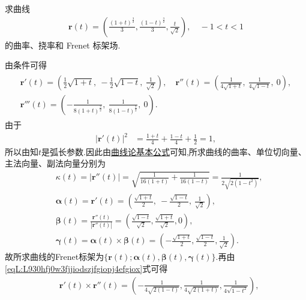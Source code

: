 \documentclass[../../main.tex]{subfiles}%
\begin{document}
\begin{example}
求曲线
\begin{align*}
\bm{r}(t) = \left( \frac{(1+t)^{\frac{3}{2}}}{3}, \frac{(1-t)^{\frac{3}{2}}}{3}, \frac{t}{\sqrt{2}} \right),\quad -1 < t < 1
\end{align*}
的曲率、挠率和 Frenet 标架场.
\end{example}
\begin{solution}
由条件可得
\begin{gather}\label{eqL:L930hfj0w3fjjiodszjfgiopj4efgiox}
\begin{gathered}
\bm{r}'(t) = \left( \frac{1}{2}\sqrt{1+t},\ -\frac{1}{2}\sqrt{1-t},\ \frac{1}{\sqrt{2}} \right), \quad
\bm{r}''(t) = \left( \frac{1}{4\sqrt{1+t}},\ \frac{1}{4\sqrt{1-t}},\ 0 \right), \\
\bm{r}'''(t) = \left( -\frac{1}{8(1+t)^{\frac{3}{2}}},\ \frac{1}{8(1-t)^{\frac{3}{2}}},\ 0 \right).
\end{gathered}
\end{gather}
由于
\begin{align*}
|\bm{r}'(t)|^2 &= \frac{1+t}{4}+\frac{1-t}{4}+\frac{1}{2}=1,
\end{align*}
所以由知$t$是弧长参数.因此由\hyperref[theorem:曲线论基本公式]{曲线论基本公式}可知,所求曲线的曲率、单位切向量、主法向量、副法向量分别为
\begin{align*}
&\kappa (t)=|\boldsymbol{r}'' (t)|=\sqrt{\frac{1}{16(1+t)}+\frac{1}{16(1-t)}}=\frac{1}{2\sqrt{2(1-t^2)}},
\\
&\bm{\alpha}(t) = \bm{r}'(t) = \left( \frac{\sqrt{1+t}}{2},\ -\frac{\sqrt{1-t}}{2},\ \frac{1}{\sqrt{2}} \right),
\\
&\boldsymbol{\beta }(t)=\frac{\boldsymbol{r}'' (t)}{|\boldsymbol{r}'' (t)|}=\left( \frac{\sqrt{1-t}}{\sqrt{2}}, \frac{\sqrt{1+t}}{\sqrt{2}}, 0 \right) ,
\\
&\boldsymbol{\gamma }\left( t \right) =\boldsymbol{\alpha }\left( t \right) \times \boldsymbol{\beta }\left( t \right) =\left( -\frac{\sqrt{1+t}}{2}, \frac{\sqrt{1-t}}{2}, \frac{1}{\sqrt{2}} \right) .
\end{align*}
故所求曲线的Frenet标架为$\{\bm{r}(t);\bm{\alpha}(t),\bm{\beta}(t),\bm{\gamma}(t)\}$.再由\eqref{eqL:L930hfj0w3fjjiodszjfgiopj4efgiox}式可得
\begin{align*}
&\boldsymbol{r}' \left( t \right) \times \boldsymbol{r}'' \left( t \right) =\left( -\frac{1}{4\sqrt{2\left( 1-t \right)}},\frac{1}{4\sqrt{2\left( 1+t \right)}},\frac{1}{4\sqrt{1-t^2}} \right) ,
\\

\end{align*}
\end{solution}
\end{document}
